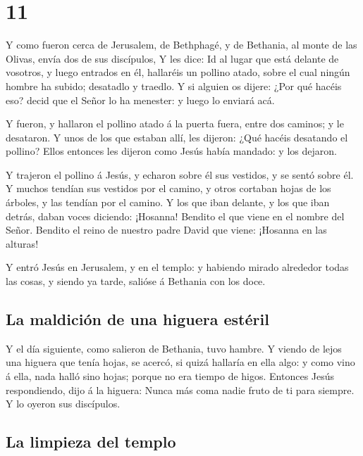 \hypertarget{section-41-11}{%
\section{11}\label{section-41-11}}

 Y como fueron cerca de Jerusalem, de Bethphagé, y de
Bethania, al monte de las Olivas, envía dos de sus discípulos,
 Y les dice: Id al lugar que está delante de vosotros, y
luego entrados en él, hallaréis un pollino atado, sobre el cual ningún
hombre ha subido; desatadlo y traedlo.  Y si alguien os
dijere: ¿Por qué hacéis eso? decid que el Señor lo ha menester: y luego
lo enviará acá.

 Y fueron, y hallaron el pollino atado á la puerta fuera,
entre dos caminos; y le desataron.  Y unos de los que
estaban allí, les dijeron: ¿Qué hacéis desatando el pollino?
 Ellos entonces les dijeron como Jesús había mandado: y
los dejaron.

 Y trajeron el pollino á Jesús, y echaron sobre él sus
vestidos, y se sentó sobre él.  Y muchos tendían sus
vestidos por el camino, y otros cortaban hojas de los árboles, y las
tendían por el camino.  Y los que iban delante, y los que
iban detrás, daban voces diciendo: ¡Hosanna! Bendito el que viene en el
nombre del Señor.  Bendito el reino de nuestro padre
David que viene: ¡Hosanna en las alturas!

 Y entró Jesús en Jerusalem, y en el templo: y habiendo
mirado alrededor todas las cosas, y siendo ya tarde, salióse á Bethania
con los doce.

\hypertarget{la-maldiciuxf3n-de-una-higuera-estuxe9ril}{%
\subsection{La maldición de una higuera
estéril}\label{la-maldiciuxf3n-de-una-higuera-estuxe9ril}}

 Y el día siguiente, como salieron de Bethania, tuvo
hambre.  Y viendo de lejos una higuera que tenía hojas,
se acercó, si quizá hallaría en ella algo: y como vino á ella, nada
halló sino hojas; porque no era tiempo de higos. 
Entonces Jesús respondiendo, dijo á la higuera: Nunca más coma nadie
fruto de ti para siempre. Y lo oyeron sus discípulos.

\hypertarget{la-limpieza-del-templo}{%
\subsection{La limpieza del templo}\label{la-limpieza-del-templo}}

